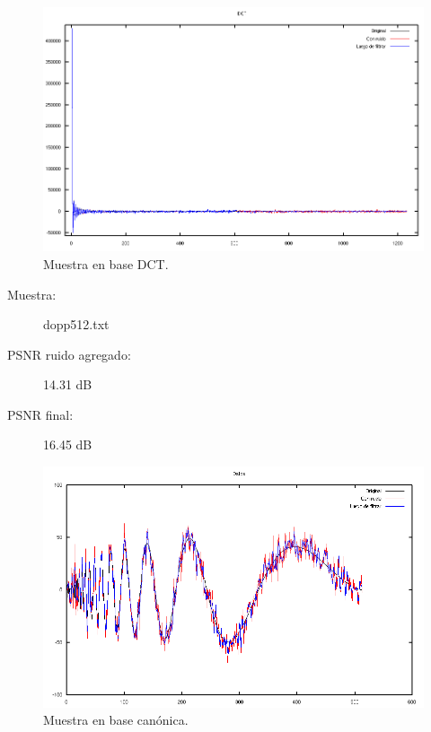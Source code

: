 \documentclass[a4paper,10pt,twoside]{article}
\begin{document}
\begin{figure}[H]
  \centering
  \includegraphics[width=15cm]{graficos/ramp_aditivo_umbralizar_dct.png} 
  \caption{Muestra en base DCT.}
\end{figure}


\begin{description}
  \item[Muestra:] dopp512.txt
  \item[PSNR ruido agregado:] 14.31 dB
  \item[PSNR final:] 16.45 dB
\end{description}

\begin{figure}[H]
  \centering
  \includegraphics[width=15cm]{graficos/dopp_aditivo_umbralizar_muestra.png}
  \caption{Muestra en base canónica.}
\end{figure}
\end{document}
